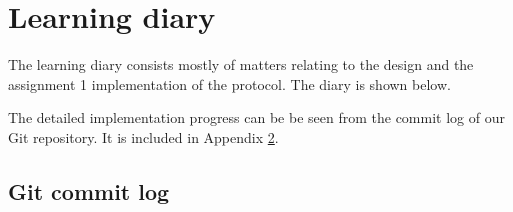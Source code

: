 \documentclass[a4paper]{article}
\begin{document}

\section{Learning diary}
The learning diary consists mostly of matters relating to the design and the
assignment 1 implementation of the protocol. The diary is shown below.

The detailed implementation progress can be be seen from the commit log of our
Git repository. It is included in Appendix \ref{lst:commit_log}.



\clearpage
\begin{appendices}
  \section{Git commit log}\label{lst:commit_log}
  
\end{appendices}
\end{document}
